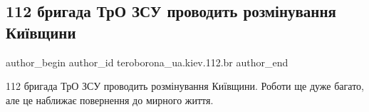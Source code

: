  
 
 
 
 
 
\subsection{112 бригада ТрО ЗСУ проводить розмінування Київщини}
\label{sec:12_04_2022.fb.teroborona_ua.kiev.112.br.1.112btro_rozminuvannja}
 
\ifcmt
 author_begin
   author_id teroborona_ua.kiev.112.br
 author_end
\fi

112 бригада ТрО ЗСУ проводить розмінування Київщини. Роботи ще дуже багато, але
це наближає повернення до мирного життя.




